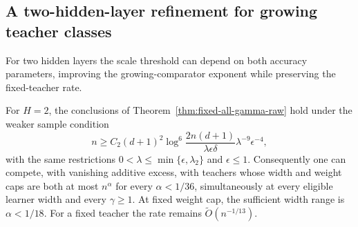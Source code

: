 \subsection{A two-hidden-layer refinement for growing teacher classes}
\label{sec:two-layer-scale-refinement}

For two hidden layers the scale threshold can depend on both accuracy
parameters, improving the growing-comparator exponent while preserving
the fixed-teacher rate.

\begin{corollary}
\label{cor:two-layer-scale-refinement}
For $H=2$, the conclusions of
Theorem~\ref{thm:fixed-all-gamma-raw} hold under the weaker sample
condition
\begin{equation}
 n\geq C_2(d+1)^2
 \log^6\!\frac{2n(d+1)}{\lambda\epsilon\delta}
                   \lambda^{-9}\epsilon^{-4},
 \label{eq:two-layer-refined-budget}
\end{equation}
with the same restrictions $0<\lambda\leq\min\{\epsilon,\lambda_2\}$
and $\epsilon\leq1$.
Consequently one can compete, with vanishing additive excess, with
teachers whose width and weight caps are both at most $n^\alpha$
for every $\alpha<1/36$, simultaneously at every eligible learner
width and every $\gamma\geq1$.  At fixed weight cap, the sufficient
width range is $\alpha<1/18$.  For a fixed teacher the rate remains
$\widetilde O(n^{-1/13})$.
\end{corollary}

